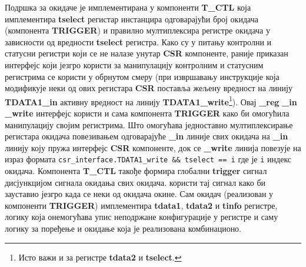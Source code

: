 Подршка за окидаче је имплементирана у компоненти \textbf{T\_CTL} која имплементира \textbf{tselect} регистар инстанцира одговарајући број окидача (компонента \textbf{TRIGGER}) и правилно мултиплексира регистре окидача у зависности од вредности \textbf{tselect} регистра. Како су у питању контролни и статусни регистри који се не налазе унутар \textbf{CSR} компоненте, раније приказан интерфејс који језгро користи за манипулацију контролним и статусним регистрима се користи у обрнутом смеру (при извршавању инструкције која модификује неки од ових регистара \textbf{CSR} поставља жељену вредност на линију \textbf{TDATA1\_in} активну вредност на линију \textbf{TDATA1\_write}\footnote{Исто важи и за регистре \textbf{tdata2} и \textbf{tselect}.}).
Овај \textbf{\_reg} \textbf{\_in} \textbf{\_write} интерфејс користи и сама компонента \textbf{TRIGGER} како би омогућила манипулацију својим регистрима. Што омогућава једноставно мултиплексирање регистара окидача повезивањем одговарајуће \textbf{\_in} линије свих окидача на \textbf{\_in} линију коју пружа интерфејс \textbf{CSR} компоненте, док се \textbf{\_write} линија повезује на израз формата \lstinline[columns=fixed]{csr_interface.TDATA1_write && tselect == i} где је \lstinline[columns=fixed]{i} индекс окидача.
Компонента \textbf{T\_CTL} такође формира глобални \textbf{trigger} сигнал дисјункцијом сигнала окидања свих окидача.  користи тај сигнал како би зауставио језгро када се неки од окидача окине.
Сам окидач (реализован у компоненти \textbf{TRIGGER}) имплементира \textbf{tdata1}, \textbf{tdata2} и \textbf{tinfo} регистре, логику која онемогућава упис неподржане конфигурације у регистре и саму логику за поређење и окидање која је реализована комбинационо.